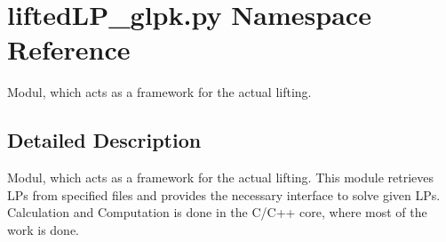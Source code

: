 \hypertarget{namespaceliftedLP__glpk_1_1py}{\section{lifted\-L\-P\-\_\-glpk.\-py Namespace Reference}
\label{namespaceliftedLP__glpk_1_1py}
}


Modul, which acts as a framework for the actual lifting.  




\subsection{Detailed Description}
Modul, which acts as a framework for the actual lifting. This module retrieves L\-Ps from specified files and provides the necessary interface to solve given L\-Ps. Calculation and Computation is done in the C/\-C++ core, where most of the work is done. 